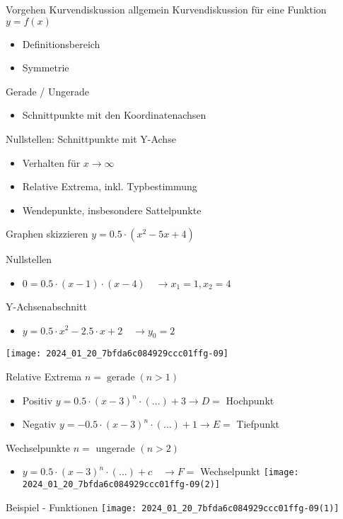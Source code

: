 \begin{KR}{Vorgehen Kurvendiskussion allgemein}
Kurvendiskussion für eine Funktion $y=f(x)$

\begin{itemize}
  \item Definitionsbereich
  \item Symmetrie
\end{itemize}

Gerade / Ungerade

\begin{itemize}
  \item Schnittpunkte mit den Koordinatenachsen
\end{itemize}

Nullstellen: Schnittpunkte mit Y-Achse

\begin{itemize}
  \item Verhalten für $x \rightarrow \infty$
  \item Relative Extrema, inkl. Typbestimmung
  \item Wendepunkte, insbesondere Sattelpunkte
\end{itemize}
\end{KR}

\begin{concept}{Graphen skizzieren}
$y=0.5 \cdot\left(x^{2}-5 x+4\right)$

Nullstellen

\begin{itemize}
  \item $0=0.5 \cdot(x-1) \cdot(x-4) \quad \rightarrow x_{1}=1, x_{2}=4$
\end{itemize}

Y-Achsenabschnitt

\begin{itemize}
  \item $y=0.5 \cdot x^{2}-2.5 \cdot x+2 \quad \rightarrow y_{0}=2$
\end{itemize}

\begin{center}
\texttt{[image: 2024\_01\_20\_7bfda6c084929ccc01ffg-09]}
\end{center}

Relative Extrema $n=\operatorname{gerade}(n>1)$

\begin{itemize}
  \item Positiv $y=0.5 \cdot(x-3)^{n} \cdot(\ldots)+3 \rightarrow D=$ Hochpunkt
  \item Negativ $y=-0.5 \cdot(x-3)^{n} \cdot(\ldots)+1 \rightarrow E=$ Tiefpunkt
\end{itemize}

Wechselpunkte $n=$ ungerade $(n>2)$

\begin{itemize}
  \item $y=0.5 \cdot(x-3)^{n} \cdot(\ldots)+c \quad \rightarrow F=$ Wechselpunkt
\texttt{[image: 2024\_01\_20\_7bfda6c084929ccc01ffg-09(2)]}
\end{itemize}


    
\end{concept}

Beispiel - Funktionen
\texttt{[image: 2024\_01\_20\_7bfda6c084929ccc01ffg-09(1)]}